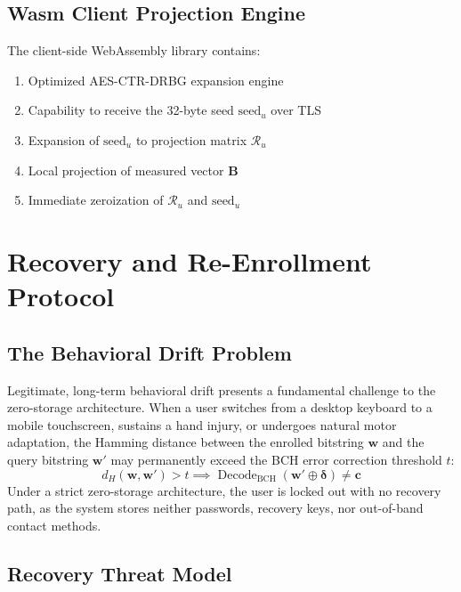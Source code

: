 \documentclass[11pt,twoside]{amsart}
\theoremstyle{plain}
\theoremstyle{definition}
\theoremstyle{remark}
\DeclareMathOperator{\Decode}{Decode}
\newcommand{\bB}{\mathbf{B}}
\newcommand{\bw}{\mathbf{w}}
\newcommand{\bc}{\mathbf{c}}
\newcommand{\bdelta}{\boldsymbol{\delta}}
\newcommand{\calR}{\mathcal{R}}
\begin{document}
\subsection{Wasm Client Projection Engine}

The client-side WebAssembly library contains:
\begin{enumerate}
    \item Optimized AES-CTR-DRBG expansion engine
    \item Capability to receive the 32-byte seed $\text{seed}_u$ over TLS
    \item Expansion of $\text{seed}_u$ to projection matrix $\calR_u$
    \item Local projection of measured vector $\bB$
    \item Immediate zeroization of $\calR_u$ and $\text{seed}_u$
\end{enumerate}

\section{Recovery and Re-Enrollment Protocol}

\subsection{The Behavioral Drift Problem}

Legitimate, long-term behavioral drift presents a fundamental challenge to the zero-storage architecture. When a user switches from a desktop keyboard to a mobile touchscreen, sustains a hand injury, or undergoes natural motor adaptation, the Hamming distance between the enrolled bitstring $\bw$ and the query bitstring $\bw'$ may permanently exceed the BCH error correction threshold $t$:
\begin{equation}
d_H(\bw, \bw') > t \implies \Decode_{\text{BCH}}(\bw' \oplus \bdelta) \neq \bc
\end{equation}
Under a strict zero-storage architecture, the user is locked out with no recovery path, as the system stores neither passwords, recovery keys, nor out-of-band contact methods.

\subsection{Recovery Threat Model}
\end{document}
